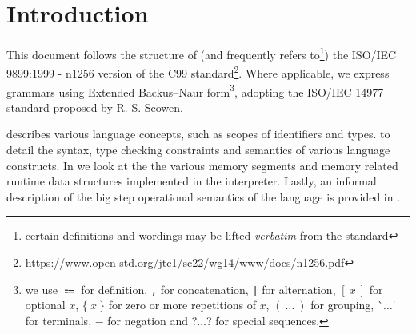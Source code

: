 \newpage
\section*{Introduction}\label{sec:intro}

This document follows the structure of (and frequently refers to\footnote{certain definitions and wordings may be lifted \emph{verbatim} from the standard}) the ISO/IEC
9899:1999 - n1256 version of the C99 standard\footnote{\href{https://www.open-std.org/jtc1/sc22/wg14/www/docs/n1256.pdf}{https://www.open-std.org/jtc1/sc22/wg14/www/docs/n1256.pdf}}.
Where applicable, we express grammars using Extended Backus–Naur form\footnote{we use $\Coloneqq$ for definition, \lstinline{,} for concatenation, \lstinline{|} for alternation, $[\ x\ ]$ for optional $x$, $\{\ x\ \}$ for zero or more repetitions of $x$, $(\ \dots\ )$ for grouping, {\textsf `}$\dots${\textsf '} for terminals, $-$ for negation and {\textsf ?}$\dots${\textsf ?} for special sequences.}, adopting the ISO/IEC 14977 standard proposed by R. S. Scowen.
\par
{}
\vspace{10pt}
\par
{} describes various language concepts, such as scopes of identifiers and types.
 to  detail the syntax, type checking constraints and semantics of various language constructs.
In  we look at the the various memory segments and memory related runtime data structures implemented in the interpreter.
Lastly, an informal description of the big step operational semantics of the language is provided in .
